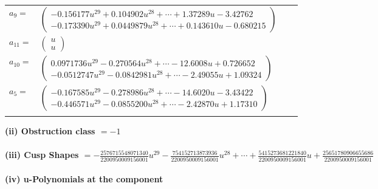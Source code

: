 \documentclass[1p]{elsarticle_modified}
\theoremstyle{definition}
\begin{document}
\begin{tabular}{m{7pt} m{180pt} m{7pt} m{180pt} }
\flushright $a_{9}=$&$\begin{pmatrix}-0.156177 u^{29}+0.104902 u^{28}+\cdots+1.37289 u-3.42762\\-0.173390 u^{29}+0.0449879 u^{28}+\cdots+0.143610 u-0.680215\end{pmatrix}$ \\
\flushright $a_{11}=$&$\begin{pmatrix}u\\u\end{pmatrix}$ \\
\flushright $a_{10}=$&$\begin{pmatrix}0.0971736 u^{29}-0.270564 u^{28}+\cdots-12.6008 u+0.726652\\-0.0512747 u^{29}-0.0842981 u^{28}+\cdots-2.49055 u+1.09324\end{pmatrix}$ \\
\flushright $a_{5}=$&$\begin{pmatrix}-0.167585 u^{29}-0.278986 u^{28}+\cdots-14.6020 u-3.43422\\-0.446571 u^{29}-0.0855200 u^{28}+\cdots-2.42870 u+1.17310\end{pmatrix}$\\&\end{tabular}
\flushleft \textbf{(ii) Obstruction class $= -1$}\\~\\
\flushleft \textbf{(iii) Cusp Shapes $= -\frac{2576715548071340}{2200950009156001} u^{29}-\frac{754152713873936}{2200950009156001} u^{28}+\cdots+\frac{5415273681221840}{2200950009156001} u+\frac{25651780906655686}{2200950009156001}$}\\~\\
\newpage\renewcommand{\arraystretch}{1}
\flushleft \textbf{(iv) u-Polynomials at the component}\newline \\
\end{document}
